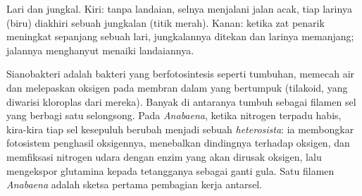 \begin{omfigure}

{\small Lari dan jungkal. Kiri: tanpa landaian, selnya menjalani jalan
acak, tiap larinya (biru) diakhiri sebuah jungkalan (titik merah).
Kanan: ketika zat penarik meningkat sepanjang sebuah lari, jungkalannya
ditekan dan larinya memanjang; jalannya menghanyut menaiki landaiannya.}
\end{omfigure}

\begin{example}\label{ex:b2:unicellular-diversity:cyanobacteria}
Sianobakteri adalah bakteri yang berfotosintesis seperti tumbuhan,
memecah air dan melepaskan oksigen pada membran dalam yang bertumpuk
(tilakoid, yang diwarisi kloroplas dari mereka). Banyak di antaranya
tumbuh sebagai filamen sel yang berbagi satu selongsong. Pada
\emph{Anabaena}, ketika nitrogen terpadu habis, kira-kira tiap sel
kesepuluh berubah menjadi sebuah \emph{heterosista}: ia membongkar
fotosistem penghasil oksigennya, menebalkan dindingnya terhadap
oksigen, dan memfiksasi nitrogen udara dengan enzim yang akan dirusak
oksigen, lalu mengekspor glutamina kepada tetangganya sebagai ganti
gula. Satu filamen \emph{Anabaena} adalah sketsa pertama pembagian
kerja antarsel.
\end{example}


